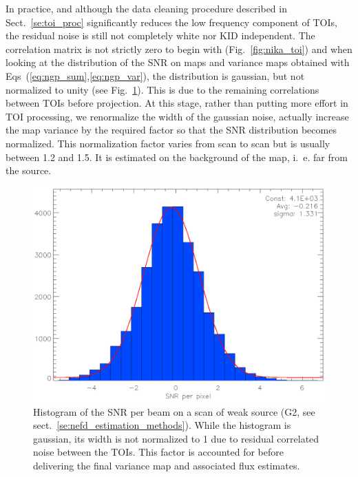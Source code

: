 In practice, and although the data cleaning procedure described in
Sect.~\ref{se:toi_proc} significantly reduces the low frequency component of
TOIs, the residual noise is still not completely white nor KID independent. The
correlation matrix is not strictly zero to begin with (Fig.~\ref{fig:nika_toi})
and when looking at the distribution of the SNR on maps and variance maps
obtained with Eqs~(\ref{eq:ngp_sum},\ref{eq:ngp_var}), the distribution is
gaussian, but not normalized to unity (see Fig.~\ref{fig:sigma_boost}). This is
due to the remaining correlations between TOIs before projection. At this stage,
rather than putting more effort in TOI processing, we renormalize the width of
the gaussian noise, actually increase the map variance by the required factor
so that the SNR distribution becomes normalized. This normalization factor
varies from scan to scan but is usually between 1.2 and 1.5. It is estimated on
the background of the map, i.~e. far from the source.

\begin{figure}[hhh]
\begin{center}
\includegraphics[clip, angle=0, scale=1]{Figures/sigma_boost.eps}
\caption{Histogram of the SNR per beam on a scan of weak source (G2, see
  sect.~\ref{se:nefd_estimation_methods}). While the histogram is gaussian, its
  width is not normalized to 1 due to residual correlated noise between the
  TOIs. This factor is accounted for before delivering the final variance map
  and associated flux estimates.}
\label{fig:sigma_boost}
\end{center}
\end{figure}

